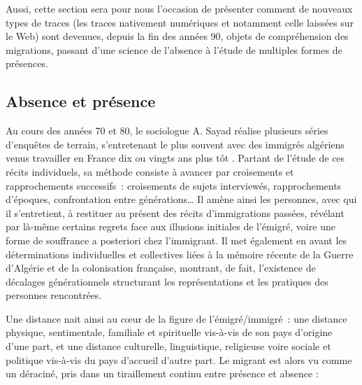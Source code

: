 \documentclass[symmetric,justified,marginals=raggedouter]{tufte-book}
\begin{document}
Aussi, cette section sera pour nous l'occasion de présenter comment de nouveaux types de traces (les traces nativement numériques et notamment celle laissées sur le Web) sont devenues, depuis la fin des années 90, objets de compréhension des migrations, passant d'une science de l'absence à l'étude de multiples formes de présences.  

\subsection{Absence et présence}

\noindent Au cours des années 70 et 80, le sociologue A. Sayad réalise plusieurs séries d'enquêtes de terrain, s'entretenant le plus souvent avec des immigrés algériens venus travailler en France dix ou vingts ans plus tôt \citep{sayad_double_2000}. Partant de l'étude de ces récits individuels, sa méthode consiste à avancer par croisements et rapprochements successifs~: croisements de sujets interviewés, rapprochements d'époques, confrontation entre générations\ldots{} Il amène ainsi les personnes, avec qui il s'entretient, à restituer au présent des récits d'immigrations passées, révélant par là-même certains regrets face aux illusions initiales de l'émigré, voire une forme de souffrance a posteriori chez l'immigrant. Il met également en avant les déterminations individuelles et collectives liées à la mémoire récente de la Guerre d'Algérie et de la colonisation française, montrant, de fait, l'existence de décalages générationnels structurant les représentations et les pratiques des personnes rencontrées.  

Une distance nait ainsi au cœur de la figure de l'émigré/immigré~: une distance physique, sentimentale, familiale et spirituelle vis-à-vis de son pays d'origine d'une part, et une distance culturelle, linguistique, religieuse voire sociale et politique vis-à-vis du pays d'accueil d'autre part. Le migrant est alors vu comme un déraciné, pris dans un tiraillement continu entre présence et absence :\\
\end{document}
